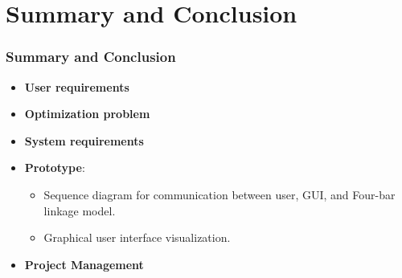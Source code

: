 \documentclass[ucs,10pt]{beamer}
\begin{document}
\section{Summary and Conclusion}

\begin{frame}
\frametitle{Summary and Conclusion}
    \begin{itemize}
        \item \textbf{User requirements}
        \item \textbf{Optimization problem}
        \item \textbf{System requirements}
        \item \textbf{Prototype}:
        \begin{itemize}
            \item Sequence diagram for communication between user, GUI, and Four-bar linkage model.
            \item Graphical user interface visualization.
        \end{itemize}
        \item \textbf{Project Management}
    \end{itemize}
\end{frame}
\end{document}
